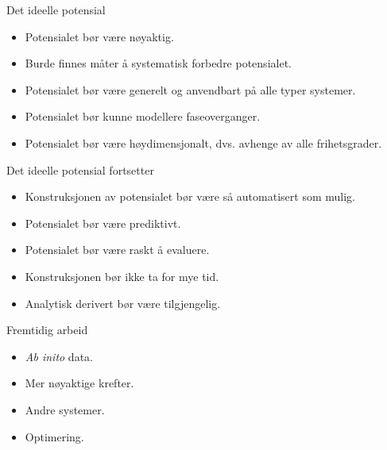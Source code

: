 \documentclass{beamer}
\begin{document}
\begin{frame}

\begin{block}{Det ideelle potensial}
 \begin{itemize}
  \item Potensialet bør være nøyaktig.
        
  \item Burde finnes måter å systematisk forbedre potensialet.
        
  \item Potensialet bør være generelt og anvendbart på alle typer systemer.
	
  \item Potensialet bør kunne modellere faseoverganger.
	
  \item Potensialet bør være høydimensjonalt, dvs. avhenge av alle frihetsgrader.

 \end{itemize}
\end{block}

\end{frame}


\begin{frame}

\begin{block}{Det ideelle potensial fortsetter}
 \begin{itemize}
  \item Konstruksjonen av potensialet bør være så automatisert som mulig.
  \item Potensialet bør være prediktivt. 
  \item Potensialet bør være raskt å evaluere.
  \item Konstruksjonen bør ikke ta for mye tid. 
  \item Analytisk derivert bør være tilgjengelig. 
 \end{itemize}
\end{block}

\end{frame}


\begin{frame}

\begin{block}{Fremtidig arbeid}
 \begin{itemize}
  \item \textit{Ab inito} data. 
  \item Mer nøyaktige krefter. 
  \item Andre systemer. 
  \item Optimering. 
 \end{itemize}
\end{block}

\end{frame}
\end{document}
